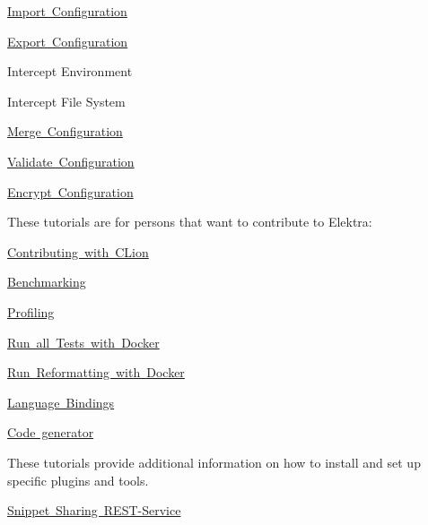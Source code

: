 \begin{DoxyItemize}
\item \mbox{\hyperlink{doc_tutorials_import_md}{Import Configuration}}
\item \mbox{\hyperlink{doc_tutorials_export_md}{Export Configuration}}
\item Intercept Environment
\item Intercept File System
\item \mbox{\hyperlink{doc_tutorials_merge_md}{Merge Configuration}}
\item \mbox{\hyperlink{validation.md_doc_tutorials_validation_md}{Validate Configuration}}
\item \mbox{\hyperlink{doc_tutorials_crypto_md}{Encrypt Configuration}}
\end{DoxyItemize}

These tutorials are for persons that want to contribute to Elektra\+:


\begin{DoxyItemize}
\item \mbox{\hyperlink{doc_tutorials_contributing-clion_md}{Contributing with C\+Lion}}
\item \mbox{\hyperlink{doc_tutorials_benchmarking_md}{Benchmarking}}
\item \mbox{\hyperlink{doc_tutorials_profiling_md}{Profiling}}
\item \mbox{\hyperlink{doc_tutorials_run_all_tests_with_docker_md}{Run all Tests with Docker}}
\item \mbox{\hyperlink{doc_tutorials_run_reformatting_script_with_docker_md}{Run Reformatting with Docker}}
\item \mbox{\hyperlink{doc_tutorials_language-bindings_md}{Language Bindings}}
\item \mbox{\hyperlink{doc_tutorials_code-generator_md}{Code generator}}
\end{DoxyItemize}

These tutorials provide additional information on how to install and set up specific plugins and tools.


\begin{DoxyItemize}
\item \mbox{\hyperlink{doc_tutorials_snippet-sharing-rest-service_md}{Snippet Sharing R\+E\+S\+T-\/\+Service}} 
\end{DoxyItemize}